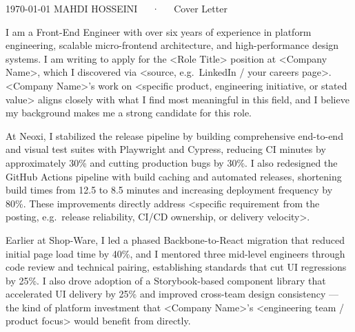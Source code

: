 \documentclass[11pt, a4paper]{awesome-cv}
\begin{document}
\makecvheader[L]

\makecvfooter
{\today}
{}
{MAHDI HOSSEINI~~~·~~~Cover Letter}

\makelettertitle

\begin{cvletter}

  I am a Front-End Engineer with over six years of experience in platform engineering, scalable micro-frontend architecture, and high-performance design systems. I am writing to apply for the <Role Title> position at <Company Name>, which I discovered via <source, e.g.\ LinkedIn / your careers page>. <Company Name>'s work on <specific product, engineering initiative, or stated value> aligns closely with what I find most meaningful in this field, and I believe my background makes me a strong candidate for this role.

  At Neoxi, I stabilized the release pipeline by building comprehensive end-to-end and visual test suites with Playwright and Cypress, reducing CI minutes by approximately 30\% and cutting production bugs by 30\%. I also redesigned the GitHub Actions pipeline with build caching and automated releases, shortening build times from 12.5 to 8.5 minutes and increasing deployment frequency by 80\%. These improvements directly address <specific requirement from the posting, e.g.\ release reliability, CI/CD ownership, or delivery velocity>.

  Earlier at Shop-Ware, I led a phased Backbone-to-React migration that reduced initial page load time by 40\%, and I mentored three mid-level engineers through code review and technical pairing, establishing standards that cut UI regressions by 25\%. I also drove adoption of a Storybook-based component library that accelerated UI delivery by 25\% and improved cross-team design consistency — the kind of platform investment that <Company Name>'s <engineering team / product focus> would benefit from directly.


\end{cvletter}
\end{document}
